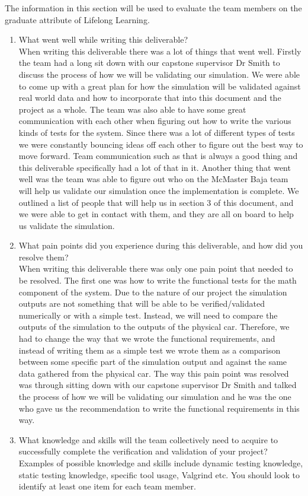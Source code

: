 \documentclass[12pt, titlepage]{article}
\begin{document}
The information in this section will be used to evaluate the team members on the
graduate attribute of Lifelong Learning.



\begin{enumerate}
  \item What went well while writing this deliverable?\\ 
  When writing this deliverable there was a lot of things that went well.
  Firstly the team had a long sit down with our capstone supervisor Dr Smith to discuss the process of how we will be validating our simulation.
  We were able to come up with a great plan for how the simulation will be validated against real world data and how to incorporate that into this document and the project as a whole.
  The team was also able to have some great communication with each other when figuring out how to write the various kinds of tests for the system.
  Since there was a lot of different types of tests we were constantly bouncing ideas off each other to figure out the best way to move forward.
  Team communication such as that is always a good thing and this deliverable specifically had a lot of that in it.
  Another thing that went well was the team was able to figure out who on the McMaster Baja team will help us validate our simulation once the implementation is complete.
  We outlined a list of people that will help us in section 3 of this document, and we were able to get in contact with them, and they are all on board to help us validate the simulation.  

  \item What pain points did you experience during this deliverable, and how
    did you resolve them?\\
    When writing this deliverable there was only one pain point that needed to be resolved.
    The first one was how to write the functional tests for the math component of the system.
    Due to the nature of our project the simulation outputs are not something that will be able to be verified/validated numerically or with a simple test.
    Instead, we will need to compare the outputs of the simulation to the outputs of the physical car.
    Therefore, we had to change the way that we wrote the functional requirements, and instead of writing them as a simple test we wrote them as a comparison between some specific part of the simulation output and against the same data gathered from the physical car.
    The way this pain point was resolved was through sitting down with our capstone supervisor Dr Smith and talked the process of how we will be validating our simulation and he was the one who gave us the recommendation to write the functional requirements in this way.
  \item What knowledge and skills will the team collectively need to acquire to
  successfully complete the verification and validation of your project?
  Examples of possible knowledge and skills include dynamic testing knowledge,
  static testing knowledge, specific tool usage, Valgrind etc.  You should look to
  identify at least one item for each team member.


\end{enumerate}
\end{document}
